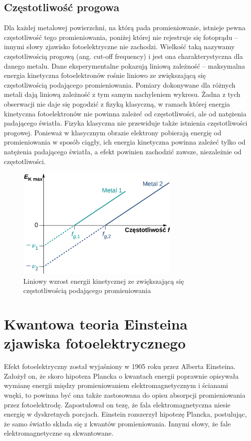 \documentclass[12pt, a4paper, notitlepage]{report}
\begin{document}
	\subsection{Częstotliwość progowa}

	Dla każdej metalowej powierzchni, na którą pada promieniowanie, istnieje pewna
	częstotliwość tego promieniowania, poniżej której nie rejestruje się fotoprądu
	– innymi słowy zjawisko fotoelektryczne nie zachodzi. Wielkość taką nazywamy
	częstotliwością progową (ang. cut-off frequency) i jest ona charakterystyczna dla
	danego metalu. Dane eksperymentalne pokazują liniową zależność – maksymalna
	energia kinetyczna fotoelektronów rośnie liniowo ze zwiększającą się
	częstotliwością podającego promieniowania. Pomiary dokonywane dla różnych metali
	dają liniową zależność z tym samym nachyleniem wykresu. Żadna z tych
	obserwacji nie daje się pogodzić z fizyką klasyczną, w ramach której energia kinetyczna
	fotoelektronów nie powinna zależeć od częstotliwości, ale od natężenia
	padającego światła. Fizyka klasyczna nie przewiduje także istnienia częstotliwości
	progowej. Ponieważ w klasycznym obrazie elektrony pobierają energię od
	promieniowania w sposób ciągły, ich energia kinetyczna powinna zależeć tylko od
	natężenia padającego światła, a efekt powinien zachodzić zawsze, niezależnie od
	częstotliwości.

	\begin{figure}[htp]
		\centering
		\includegraphics[width=8cm]{img/rysunek_1.4.jpeg}
		\caption{Liniowy wzrost energii kinetycznej ze zwiększającą się
		częstotliwością podającego promieniowania}
		\label{fig:4}
	\end{figure}

	\section{Kwantowa teoria Einsteina zjawiska fotoelektrycznego}
	Efekt fotoelektryczny został wyjaśniony w 1905 roku przez Alberta Einsteina. Założył
	on, że skoro hipoteza Plancka o kwantach energii poprawnie opisywała wymianę
	energii między promieniowaniem elektromagnetycznym i ścianami wnęki, to powinna
	być ona także zastosowana do opisu absorpcji promieniowania przez fotoelektrodę.
	Zapostulował on tezę, że fala elektromagnetyczna niesie energię w dyskretnych porcjach.
	Einstein rozszerzył hipotezę Plancka, postulując, że samo światło składa się z
	kwantów promieniowania. Innymi słowy, że fale elektromagnetyczne są
	skwantowane.
\end{document}
